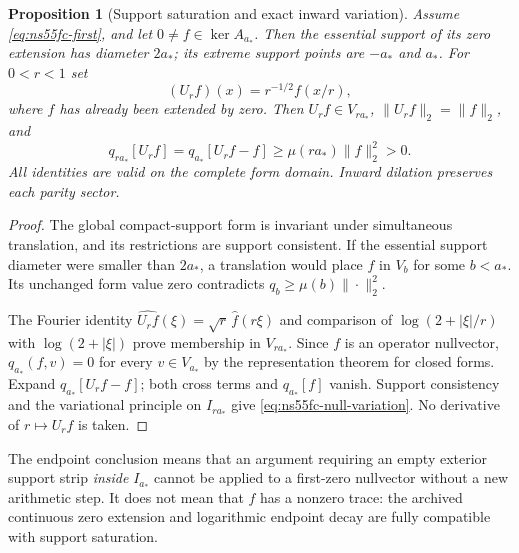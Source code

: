 \documentclass[11pt]{article}
\newtheorem{proposition}[theorem]{Proposition}
\theoremstyle{remark}
\begin{document}
\begin{proposition}[Support saturation and exact inward variation]
\label{prop:ns55fc-geometry}
Assume \eqref{eq:ns55fc-first}, and let $0\ne f\in\ker A_{a_*}$.
Then the essential support of its zero extension has diameter $2a_*$;
its extreme support points are $-a_*$ and $a_*$. For $0<r<1$ set
\[
 (U_rf)(x)=r^{-1/2}f(x/r),
\]
where $f$ has already been extended by zero. Then $U_rf\in V_{ra_*}$,
$\|U_rf\|_2=\|f\|_2$, and
\begin{equation}\label{eq:ns55fc-null-variation}
 q_{ra_*}[U_rf]
 =q_{a_*}[U_rf-f]
 \ge\mu(ra_*)\|f\|_2^2>0.
\end{equation}
All identities are valid on the complete form domain. Inward dilation
preserves each parity sector.
\end{proposition}
\begin{proof}
The global compact-support form is invariant under simultaneous
translation, and its restrictions are support consistent. If the
essential support diameter were smaller than $2a_*$, a translation
would place $f$ in $V_b$ for some $b<a_*$. Its unchanged form value
zero contradicts $q_b\ge\mu(b)\|\cdot\|_2^2$.

The Fourier identity $\widehat{U_rf}(\xi)=\sqrt r\,\widehat f(r\xi)$
and comparison of $\log(2+|\xi|/r)$ with $\log(2+|\xi|)$ prove
membership in $V_{ra_*}$. Since $f$ is an operator nullvector,
$q_{a_*}(f,v)=0$ for every $v\in V_{a_*}$ by the representation
theorem for closed forms. Expand $q_{a_*}[U_rf-f]$; both cross terms
and $q_{a_*}[f]$ vanish. Support consistency and the variational
principle on $I_{ra_*}$ give \eqref{eq:ns55fc-null-variation}.
No derivative of $r\mapsto U_rf$ is taken.
\end{proof}

The endpoint conclusion means that an argument requiring an empty
exterior support strip \emph{inside} $I_{a_*}$ cannot be applied to
a first-zero nullvector without a new arithmetic step. It does not
mean that $f$ has a nonzero trace: the archived continuous zero
extension and logarithmic endpoint decay are fully compatible with
support saturation.
\end{document}
